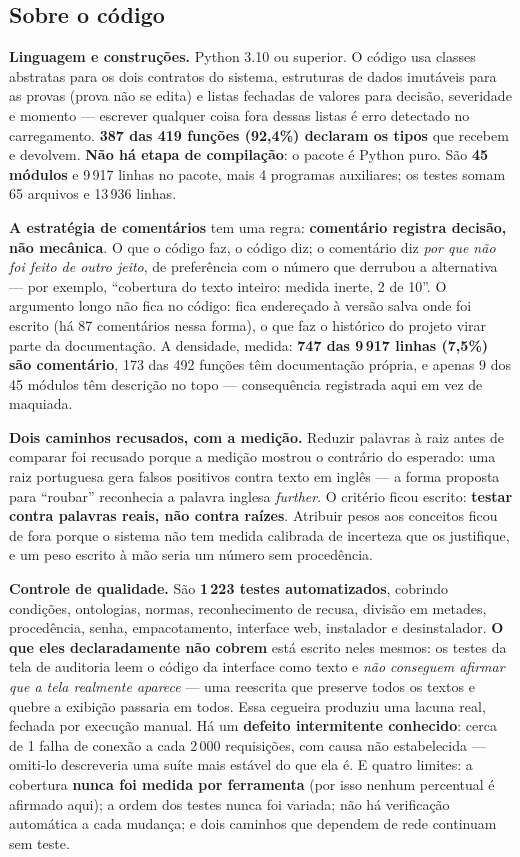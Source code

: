 \documentclass[10pt]{article}
\begin{document}
\subsection{Sobre o código}

\textbf{Linguagem e construções.} Python 3.10 ou superior. O código usa classes abstratas para os dois contratos do sistema, estruturas de dados imutáveis para as provas (prova não se edita) e listas fechadas de valores para decisão, severidade e momento --- escrever qualquer coisa fora dessas listas é erro detectado no carregamento. \textbf{387 das 419 funções (92,4\%) declaram os tipos} que recebem e devolvem. \textbf{Não há etapa de compilação}: o pacote é Python puro. São \textbf{45 módulos} e 9\,917 linhas no pacote, mais 4 programas auxiliares; os testes somam 65 arquivos e 13\,936 linhas.

\textbf{A estratégia de comentários} tem uma regra: \textbf{comentário registra decisão, não mecânica}. O que o código faz, o código diz; o comentário diz \emph{por que não foi feito de outro jeito}, de preferência com o número que derrubou a alternativa --- por exemplo, ``cobertura do texto inteiro: medida inerte, 2 de 10''. O argumento longo não fica no código: fica endereçado à versão salva onde foi escrito (há 87 comentários nessa forma), o que faz o histórico do projeto virar parte da documentação. A densidade, medida: \textbf{747 das 9\,917 linhas (7,5\%) são comentário}, 173 das 492 funções têm documentação própria, e apenas 9 dos 45 módulos têm descrição no topo --- consequência registrada aqui em vez de maquiada.

\textbf{Dois caminhos recusados, com a medição.} Reduzir palavras à raiz antes de comparar foi recusado porque a medição mostrou o contrário do esperado: uma raiz portuguesa gera falsos positivos contra texto em inglês --- a forma proposta para ``roubar'' reconhecia a palavra inglesa \emph{further}. O critério ficou escrito: \textbf{testar contra palavras reais, não contra raízes}. Atribuir pesos aos conceitos ficou de fora porque o sistema não tem medida calibrada de incerteza que os justifique, e um peso escrito à mão seria um número sem procedência.

\textbf{Controle de qualidade.} São \textbf{1\,223 testes automatizados}, cobrindo condições, ontologias, normas, reconhecimento de recusa, divisão em metades, procedência, senha, empacotamento, interface web, instalador e desinstalador. \textbf{O que eles declaradamente não cobrem} está escrito neles mesmos: os testes da tela de auditoria leem o código da interface como texto e \emph{não conseguem afirmar que a tela realmente aparece} --- uma reescrita que preserve todos os textos e quebre a exibição passaria em todos. Essa cegueira produziu uma lacuna real, fechada por execução manual. Há um \textbf{defeito intermitente conhecido}: cerca de 1 falha de conexão a cada 2\,000 requisições, com causa não estabelecida --- omiti-lo descreveria uma suíte mais estável do que ela é. E quatro limites: a cobertura \textbf{nunca foi medida por ferramenta} (por isso nenhum percentual é afirmado aqui); a ordem dos testes nunca foi variada; não há verificação automática a cada mudança; e dois caminhos que dependem de rede continuam sem teste.
\end{document}
